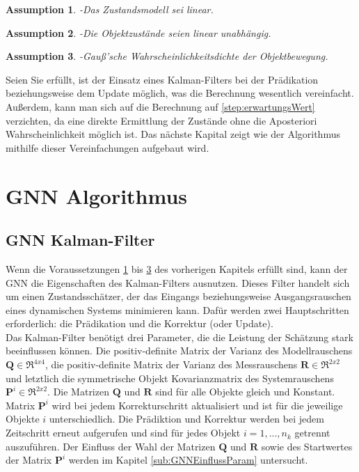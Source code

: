 \documentclass[10pt,a4paper]{article}
\newtheorem{assumption}{Assumption}
\begin{document}
\begin{assumption}-\label{Ass:LinMod}
  Das Zustandsmodell sei linear.
\end{assumption}
\begin{assumption}-\label{Ass:ZustUnab}
  Die Objektzustände seien linear unabhängig.
\end{assumption}
\begin{assumption}-\label{AssGauss}
  Gauß'sche Wahrscheinlichkeitsdichte der Objektbewegung.
\end{assumption}
Seien Sie erfüllt, ist der Einsatz eines Kalman-Filters bei der Prädikation beziehungsweise dem Update möglich, was die Berechnung wesentlich vereinfacht. Außerdem, kann man sich auf die Berechnung auf \ref{step:erwartungsWert} verzichten, da eine direkte Ermittlung der Zustände ohne die Aposteriori Wahrscheinlichkeit möglich ist. Das nächste Kapital zeigt wie der Algorithmus mithilfe dieser Vereinfachungen aufgebaut wird.
\section{GNN Algorithmus}\label{subsec:GNNAlg}
\subsection{GNN Kalman-Filter}
Wenn die Voraussetzungen \ref{Ass:LinMod} bis \ref{AssGauss} des vorherigen Kapitels erfüllt sind, kann der GNN die Eigenschaften des Kalman-Filters ausnutzen. Dieses Filter handelt sich um einen Zustandsschätzer, der das Eingangs beziehungsweise Ausgangsrauschen eines dynamischen Systems minimieren kann. Dafür werden zwei Hauptschritten erforderlich: die Prädikation und die Korrektur (oder Update).\\
Das Kalman-Filter benötigt drei Parameter, die die Leistung der Schätzung stark beeinflussen können. Die positiv-definite Matrix der Varianz des Modellrauschens $\textbf{Q} \in \Re^{4x4}$, die positiv-definite Matrix der Varianz des Messrauschens $\textbf{R} \in \Re^{2x2}$ und letztlich die symmetrische  Objekt Kovarianzmatrix des Systemrauschens $\textbf{P}^i \in \Re^{2x2}$. Die Matrizen $\textbf{Q}$ und $\textbf{R}$ sind für alle Objekte gleich und Konstant. Matrix $\textbf{P}^i$ wird bei jedem Korrekturschritt aktualisiert und ist für die jeweilige Objekte $i$ unterschiedlich. Die Prädiktion und Korrektur werden bei jedem Zeitschritt erneut aufgerufen und sind für jedes Objekt $i = 1,...,n_k$ getrennt auszuführen. Der Einfluss der Wahl der Matrizen $\textbf{Q}$ und $\textbf{R}$ sowie des Startwertes der Matrix $\textbf{P}^i$ werden im Kapitel \ref{sub:GNNEinflussParam} untersucht.
\end{document}
